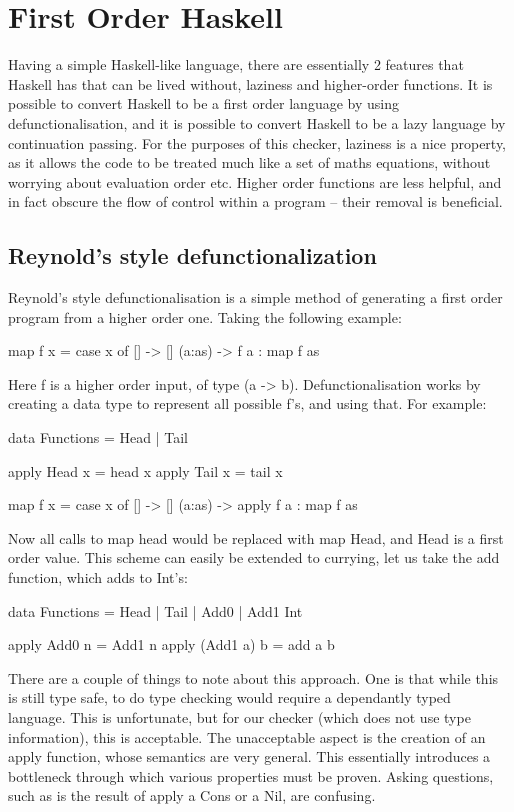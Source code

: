\documentclass[preprint]{sigplanconf}
\begin{document}
\section{First Order Haskell}
\label{chap:defunc}

Having a simple Haskell-like language, there are essentially 2 features that
Haskell has that can be lived without, laziness and higher-order functions. It
is possible to convert Haskell to be a first order language by using
defunctionalisation, and it is possible to convert Haskell to be a lazy
language by continuation passing. For the purposes of this checker, laziness is
a nice property, as it allows the code to be treated much like a set of maths
equations, without worrying about evaluation order etc. Higher order functions
are less helpful, and in fact obscure the flow of control within a program --
their removal is beneficial.

\subsection{Reynold's style defunctionalization}

Reynold's style defunctionalisation is a simple method of generating a first
order program from a higher order one. Taking the following example:

map f x = case x of
    [] -> []
    (a:as) -> f a : map f as

Here f is a higher order input, of type (a -> b). Defunctionalisation works by
creating a data type to represent all possible f's, and using that. For
example:

 data Functions = Head | Tail

 apply Head x = head x
 apply Tail x = tail x

 map f x = case x of
     [] -> []
     (a:as) -> apply f a : map f as

Now all calls to map head would be replaced with map Head, and Head is a first
order value. This scheme can easily be extended to currying, let us take the
add function, which adds to Int's:

 data Functions = Head | Tail | Add0 | Add1 Int

 apply Add0 n = Add1 n
 apply (Add1 a) b = add a b

There are a couple of things to note about this approach. One is that while
this is still type safe, to do type checking would require a dependantly typed
language. This is unfortunate, but for our checker (which does not use type
information), this is acceptable. The unacceptable aspect is the creation of an
apply function, whose semantics are very general. This essentially introduces a
bottleneck through which various properties must be proven. Asking questions,
such as is the result of apply a Cons or a Nil, are confusing.
\end{document}
